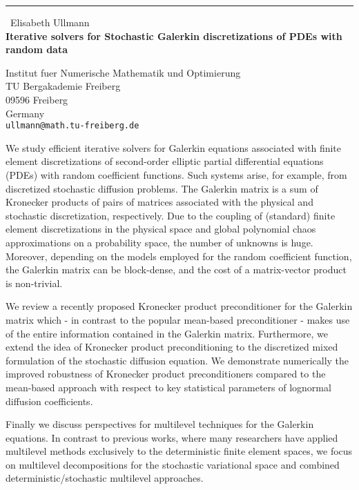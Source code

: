 \documentclass{report}
\begin{document}
\begin{center}
\rule{6in}{1pt} \
{\large Elisabeth Ullmann \\
{\bf Iterative solvers for Stochastic Galerkin discretizations of PDEs with random data}}

Institut fuer Numerische Mathematik und Optimierung \\ TU Bergakademie Freiberg \\ 09596 Freiberg \\ Germany
\\
{\tt ullmann@math.tu-freiberg.de}\end{center}

We study efficient iterative solvers for Galerkin equations associated
with finite element discretizations of second-order elliptic partial
differential equations (PDEs) with random coefficient functions. Such
systems arise, for example, from discretized stochastic diffusion
problems. The Galerkin matrix is a sum of Kronecker products of pairs of
matrices associated with the physical and stochastic discretization,
respectively. Due to the coupling of (standard) finite element
discretizations in the physical space and global polynomial chaos
approximations on a probability space, the number of unknowns is huge.
Moreover, depending on the models employed for the random coefficient
function, the Galerkin matrix can be block-dense, and the cost of a
matrix-vector product is non-trivial.

We review a recently proposed Kronecker product preconditioner for the
Galerkin matrix which - in contrast to the popular mean-based
preconditioner - makes use of the entire information contained in the
Galerkin matrix. Furthermore, we extend the idea of Kronecker product
preconditioning to the discretized mixed formulation of the stochastic
diffusion equation. We demonstrate numerically the improved robustness of
Kronecker product preconditioners compared to the mean-based approach
with respect to key statistical parameters of lognormal diffusion
coefficients.

Finally we discuss perspectives for multilevel techniques for the
Galerkin equations. In contrast to previous works, where many researchers
have applied multilevel methods exclusively to the deterministic finite
element spaces, we focus on multilevel decompositions for the stochastic
variational space and combined deterministic/stochastic multilevel
approaches.
\end{document}
